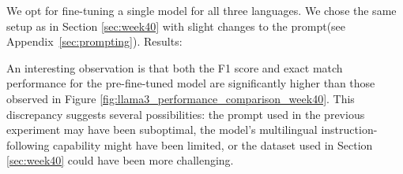 \documentclass[11pt]{article}
\begin{document}
We opt for fine-tuning a single model for all three languages. We chose the same setup as in Section \ref{sec:week40} with slight changes to the prompt(see Appendix~\vref{sec:prompting}). 
Results:
\begin{table}[ht]
    \centering
    \label{tab:week41_performance_comparison}
\end{table}

An interesting observation is that both the F1 score and exact match performance for the pre-fine-tuned model are significantly higher than those observed in Figure \ref{fig:llama3_performance_comparison_week40}. 
This discrepancy suggests several possibilities: the prompt used in the previous experiment may have been suboptimal, the model's multilingual instruction-following capability might have been limited, or the dataset used in Section \ref{sec:week40} could have been more challenging.

\begin{table}[ht]
    \centering
    \caption{Performance comparison for answerable and unanswerable questions}
    \label{tab:week41_non_answerable_performance}
\end{table}
\end{document}
